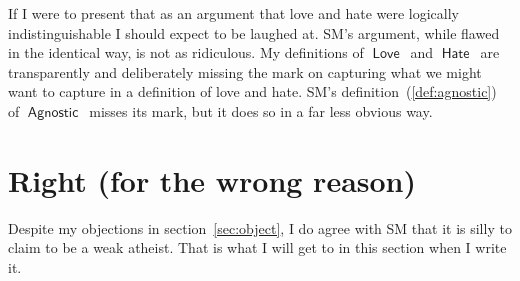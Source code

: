 \documentclass[12pt]{article}
\newcommand{\rel}[1]{\ensuremath{\mathop{\mathsf{#1}}}}
\newcommand{\rlagno}{\rel{Agnostic}}
\newcommand{\rllove}{\rel{Love}}
\newcommand{\rlhate}{\rel{Hate}}
\begin{document}
If I were to present that as an argument that love and hate were logically indistinguishable I should expect to be laughed at.
SM's argument, while flawed in the identical way, is not as ridiculous.
My definitions of \rllove\ and \rlhate\ are transparently and deliberately missing the mark on capturing what we might want to capture in a definition of love and hate.
SM's definition~(\ref{def:agnostic}) of \rlagno\ misses its mark,
but it does so in a far less obvious way.

\section{Right (for the wrong reason)}

Despite my objections in section~\ref{sec:object}, I do agree with SM that it is silly to claim to be a weak atheist. That is what I will get to in this section when I write it.

\printbibliography
\end{document}
